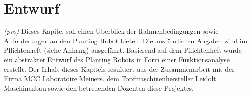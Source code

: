 \newpage
\section{Entwurf}
\textit{(pro)} Dieses Kapitel soll einen Überblick der Rahmenbedingungen sowie Anforderungen an den Planting Robot bieten. Die ausführlichen Angaben sind im Pflichtenheft (siehe Anhang) ausgeführt. Basierend auf dem Pflichtenheft wurde ein abstrakter Entwurf des Planting Robots in Form einer Funktionsanalyse erstellt. Der Inhalt dieses Kapitels resultiert aus der Zusammenarbeit mit der Firma MCC Laboratoire Meiners, dem Topfmaschinenhersteller Leidolt Maschinenbau sowie den betreuenden Dozenten diese Projektes.
